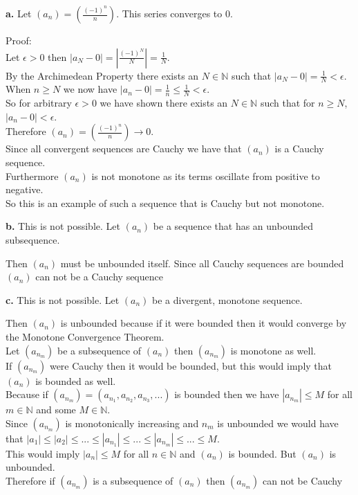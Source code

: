 \documentclass{article}
\begin{document}
{\Large \textbf{a.}} Let $(a_n) = (\frac{(-1)^n}{n})$. This series converges to 0.
\begin{center}
    \doublespacing
    Proof:
    \\Let $\epsilon > 0$ then $|a_N - 0| = |\frac{(-1)^N}{N}| =\frac{1}{N}$.
    \\By the Archimedean Property there exists an $N\in\mathbb{N}$ such that $|a_N - 0| =\frac{1}{N} <\epsilon$.
    \\When $n\geq N$ we now have $|a_n - 0| =\frac{1}{n}\leq\frac{1}{N} <\epsilon$.
    \\So for arbitrary $\epsilon > 0$ we have shown there exists an $N\in\mathbb{N}$ such that for $n\geq N$, $|a_n - 0| <\epsilon$.
    \\Therefore $(a_n) = (\frac{(-1)^n}{n})\rightarrow 0$.
    \\Since all convergent sequences are Cauchy we have that $(a_n)$ is a Cauchy sequence.
    \\Furthermore $(a_n)$ is not monotone as its terms oscillate from positive to negative.
    \\So this is an example of such a sequence that is Cauchy but not monotone.
\end{center}

{\Large \textbf{b.}} This is not possible. Let $(a_n)$ be a sequence that has an unbounded subsequence.
\begin{center}
    \doublespacing
    Then $(a_n)$ must be unbounded itself. Since all Cauchy sequences are bounded $(a_n)$ can not be a Cauchy sequence \qedsymbol
\end{center}

{\Large \textbf{c.}} This is not possible. Let $(a_n)$ be a divergent, monotone sequence.
\begin{center}
    \doublespacing
    Then $(a_n)$ is unbounded because if it were bounded then it would converge by the Monotone Convergence Theorem.
    \\Let $(a_{n_m})$ be a subsequence of $(a_n)$ then $(a_{n_m})$ is monotone as well.
    \\If $(a_{n_m})$ were Cauchy then it would be bounded, but this would imply that $(a_n)$ is bounded as well.
    \\Because if $(a_{n_m}) = (a_{n_1}, a_{n_2}, a_{n_3}, ...)$ is bounded then we have $|a_{n_m}|\leq M$ for all $m\in\mathbb{N}$ and some $M\in\mathbb{N}$.
    \\Since $(a_{n_m})$ is monotonically increasing and $n_m$ is unbounded we would have that $|a_1|\leq |a_2|\leq ...\leq |a_{n_1}|\leq ...\leq |a_{n_m}|\leq ...\leq M$.
    \\This would imply $|a_n|\leq M$ for all $n\in\mathbb{N}$ and $(a_n)$ is bounded. But $(a_n)$ is unbounded.
    \\Therefore if $(a_{n_m})$ is a subsequence of $(a_n)$ then $(a_{n_m})$ can not be Cauchy \qedsymbol
\end{center}
\end{document}
